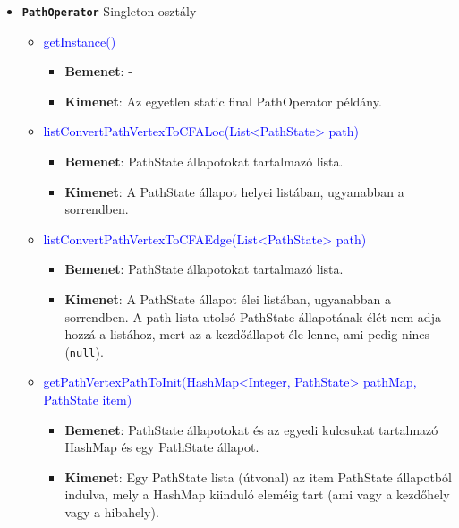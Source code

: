 \begin{itemize}
	\item \textbf{\texttt{PathOperator}} Singleton osztály
	\begin{itemize}
		\item \textcolor{blue}{getInstance()}
		\begin{itemize}
			\item \textbf{Bemenet}: -
			\item \textbf{Kimenet}: Az egyetlen static final PathOperator példány.
		\end{itemize}
	
		\item \textcolor{blue}{listConvertPathVertexToCFALoc(List<PathState> path)}
		\begin{itemize}
			\item \textbf{Bemenet}: PathState állapotokat tartalmazó lista.
			\item \textbf{Kimenet}: A PathState állapot helyei listában, ugyanabban a sorrendben.
		\end{itemize}
	
		\item \textcolor{blue}{listConvertPathVertexToCFAEdge(List<PathState> path)}
		\begin{itemize}
			\item \textbf{Bemenet}: PathState állapotokat tartalmazó lista.
			\item \textbf{Kimenet}: A PathState állapot élei listában, ugyanabban a sorrendben. A path lista utolsó PathState állapotának élét nem adja hozzá a listához, mert az a kezdőállapot éle lenne, ami pedig nincs (\texttt{null}).
		\end{itemize}
	
		\item \textcolor{blue}{getPathVertexPathToInit(HashMap<Integer, PathState> pathMap, PathState item)}
		\begin{itemize}
			\item \textbf{Bemenet}: PathState állapotokat és az egyedi kulcsukat tartalmazó HashMap és egy PathState állapot.
			\item \textbf{Kimenet}: Egy PathState lista (útvonal) az item PathState állapotból indulva, mely a HashMap kiinduló eleméig tart (ami vagy a kezdőhely vagy a hibahely).
		\end{itemize}
	\end{itemize}


\end{itemize}
